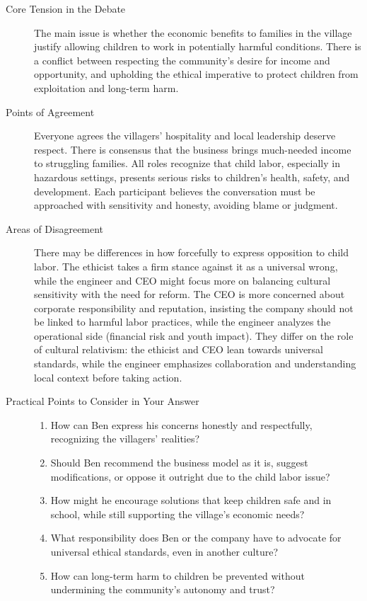 {  \begin{description}
    \item[Core Tension in the Debate]  The main issue is whether the economic benefits to families in the village justify allowing children to work in potentially harmful conditions. There is a conflict between respecting the community's desire for income and opportunity, and upholding the ethical imperative to protect children from exploitation and long-term harm.
    \item[Points of Agreement]  Everyone agrees the villagers' hospitality and local leadership deserve respect. There is consensus that the business brings much-needed income to struggling families. All roles recognize that child labor, especially in hazardous settings, presents serious risks to children's health, safety, and development. Each participant believes the conversation must be approached with sensitivity and honesty, avoiding blame or judgment.
    \item[Areas of Disagreement] There may be differences in how forcefully to express opposition to child labor. The ethicist takes a firm stance against it as a universal wrong, while the engineer and CEO might focus more on balancing cultural sensitivity with the need for reform. The CEO is more concerned about corporate responsibility and reputation, insisting the company should not be linked to harmful labor practices, while the engineer analyzes the operational side (financial risk and youth impact). They differ on the role of cultural relativism: the ethicist and CEO lean towards universal standards, while the engineer emphasizes collaboration and understanding local context before taking action.
    \item[Practical Points to Consider in Your Answer]{
        \hfill
        \begin{enumerate}[label=(\alph*)]
          \item How can Ben express his concerns honestly and respectfully, recognizing the villagers' realities?
          \item Should Ben recommend the business model as it is, suggest modifications, or oppose it outright due to the child labor issue?
          \item How might he encourage solutions that keep children safe and in school, while still supporting the village's economic needs?
          \item What responsibility does Ben or the company have to advocate for universal ethical standards, even in another culture?
          \item How can long-term harm to children be prevented without undermining the community's autonomy and trust?
        \end{enumerate}
      }
  \end{description}
}
